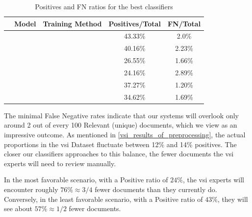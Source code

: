 \begin{table}[ht]
\centering
\begin{tabular}{ccccc}
\hline
  \contentType{}                                   & Model & Training Method & Positives/Total & FN/Total \\ \hline
  \trafilaturaTitle{} & \bertmultilingual{} & \petThousand{}  & 43.33\% & 2.0\%\\ \hline %

 \trafilaturaAbstract{} & \bertxlmroberta{} & \petThousand{} & 40.16\% & 2.23\% \\  \hline %
\trafilaturaFulltext{} & \bertmultilingual{} & \petThousand{} & 26.55\% & 1.66\%\\%
\trafilaturaFulltext{} & \bertxlmroberta{} & \balanced{} & 24.16\% &  2.89\%\\%
\trafilaturaFulltext{} & \bertxlmroberta{} & \petThousand{} & 37.27\% & 1.20\% \\ %
\hline
\translationTitle{} & \bertmultilingual{} & \petThousand{} & 34.62\% & 1.69\% \\ %
\hline
\end{tabular}
\caption{Positives and FN ratios for the best classifiers}
\label{tab:08_ratio_of_positives}
\end{table}

The minimal False Negative rates indicate that our systems will overlook only around 2 out of every 100 Relevant (unique) documents, which we view as an impressive outcome. 
As mentioned in \headerName{} \ref{vsi_results_of_preprocessing}, the actual proportions in the \gls{vsi} Dataset fluctuate between 12\% and 14\% positives. The closer our classifiers approaches to this balance, the fewer documents the \gls{vsi} experts will need to review manually.

In the most favorable scenario, with a Positive ratio of $24\%$, the \gls{vsi} experts will encounter roughly $76\% \approx 3/4$ fewer documents than they currently do. Conversely, in the least favorable scenario, with a Positive ratio of $43\%$, they will see about $57\% \approx 1/2$ fewer documents.




